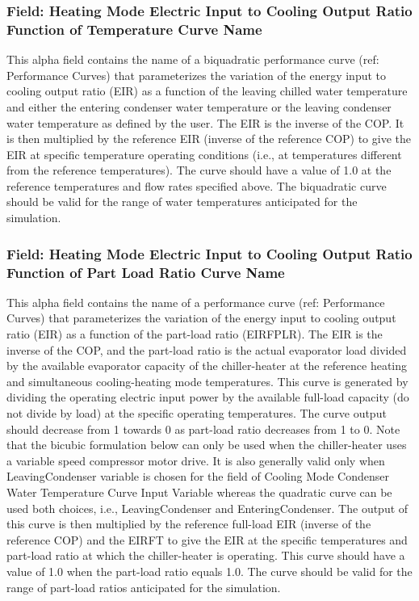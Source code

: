 \subsubsection{Field: Heating Mode Electric Input to Cooling Output Ratio Function of Temperature Curve Name}\label{field-heating-mode-electric-input-to-cooling-output-ratio-function-of-temperature-curve-name}

This alpha field contains the name of a biquadratic performance curve (ref: Performance Curves) that parameterizes the variation of the energy input to cooling output ratio (EIR) as a function of the leaving chilled water temperature and either the entering condenser water temperature or the leaving condenser water temperature as defined by the user. The EIR is the inverse of the COP. It is then multiplied by the reference EIR (inverse of the reference COP) to give the EIR at specific temperature operating conditions (i.e., at temperatures different from the reference temperatures). The curve should have a value of 1.0 at the reference temperatures and flow rates specified above. The biquadratic curve should be valid for the range of water temperatures anticipated for the simulation.

\subsubsection{Field: Heating Mode Electric Input to Cooling Output Ratio Function of Part Load Ratio Curve Name}\label{field-heating-mode-electric-input-to-cooling-output-ratio-function-of-part-load-ratio-curve-name}

This alpha field contains the name of a performance curve (ref: Performance Curves) that parameterizes the variation of the energy input to cooling output ratio (EIR) as a function of the part-load ratio (EIRFPLR). The EIR is the inverse of the COP, and the part-load ratio is the actual evaporator load divided by the available evaporator capacity of the chiller-heater at the reference heating and simultaneous cooling-heating mode temperatures. This curve is generated by dividing the operating electric input power by the available full-load capacity (do not divide by load) at the specific operating temperatures. The curve output should decrease from 1 towards 0 as part-load ratio decreases from 1 to 0. Note that the bicubic formulation below can only be used when the chiller-heater uses a variable speed compressor motor drive. It is also generally valid only when LeavingCondenser variable is chosen for the field of Cooling Mode Condenser Water Temperature Curve Input Variable whereas the quadratic curve can be used both choices, i.e., LeavingCondenser and EnteringCondenser. The output of this curve is then multiplied by the reference full-load EIR (inverse of the reference COP) and the EIRFT to give the EIR at the specific temperatures and part-load ratio at which the chiller-heater is operating. This curve should have a value of 1.0 when the part-load ratio equals 1.0. The curve should be valid for the range of part-load ratios anticipated for the simulation.

